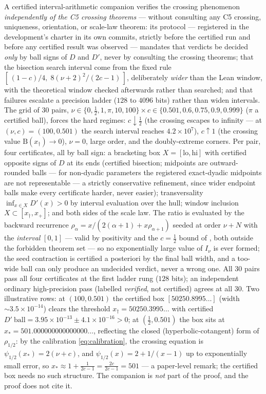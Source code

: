 \documentclass[11pt]{article}
\newcommand{\Bfam}{\mathrm{B}}
\begin{document}
A certified interval-arithmetic companion verifies the crossing
phenomenon \emph{independently of the C5 crossing theorems} ---
without consulting any C5 crossing, uniqueness, orientation, or
scale-law theorem: its protocol
--- registered in the development's charter in its own commits,
strictly before the certified run and before any certified result
was observed --- mandates that verdicts be decided \emph{only} by ball
signs of $D$ and $D'$, never by consulting the crossing theorems;
that the bisection search interval come from the fixed rule
$[\,(1-c)/4,\; 8(\nu+2)^2/(2c-1)\,]$, deliberately \emph{wider}
than the Lean window, with the theoretical window checked
afterwards rather than searched; and that failures escalate a
precision ladder ($128$ to $4096$ bits) rather than widen
intervals.  The grid of $30$ pairs,
$\nu \in \{0, \tfrac12, 1, \pi, 10, 100\} \times
c \in \{0.501, 0.6, 0.75, 0.9, 0.999\}$ ($\pi$ a certified ball),
forces the hard regimes: $c \downarrow \tfrac12$ (the crossing
escapes to infinity --- at $(\nu,c) = (100, 0.501)$ the search
interval reaches $4.2\times10^7$), $c \uparrow 1$ (the crossing
value $\Bfam(x_\dagger) \to 0$), $\nu = 0$, large order, and the
doubly-extreme corners.  Per pair, four certificates, all by ball
sign: a bracketing box $X = [\mathrm{lo}, \mathrm{hi}]$ with
certified opposite signs of $D$ at its ends (certified bisection;
midpoints are outward-rounded balls --- for non-dyadic parameters
the registered exact-dyadic midpoints are not representable --- a
strictly conservative refinement, since wider endpoint balls make
every certificate harder, never easier);
transversality $\inf_{x \in X} D'(x) > 0$ by interval evaluation
over the hull; window inclusion $X \subset [x_\dagger, x_+]$; and
both sides of the scale law.  The ratio is evaluated by the
backward recurrence
$\rho_\alpha = x/(2(\alpha+1)+x\rho_{\alpha+1})$ seeded at order
$\nu+N$ with the \emph{interval} $[0,1]$ --- valid by positivity
and the $c=\tfrac12$ bound of \cite{ErikssonC4}, both outside the
forbidden theorem set --- so no exponentially large value of
$I_\nu$ is ever formed; the seed contraction is certified a
posteriori by the final ball width, and a too-wide ball can only
produce an undecided verdict, never a wrong one.  All $30$ pairs pass all four
certificates at the first ladder rung ($128$ bits); an independent
ordinary high-precision pass (labelled \emph{verified}, not
certified) agrees at all $30$.  Two illustrative rows: at
$(100, 0.501)$ the certified box $[50250.8995\ldots]$ (width
$\sim 3.5\times10^{-14}$) clears the threshold
$x_\dagger = 50250.3995\ldots$ with certified
$D'~\mathrm{ball} = 3.95\times10^{-13} \pm 4.1\times10^{-16} > 0$;
at $(\tfrac12, 0.501)$ the box sits at
$x_* = 501.000000000000000\ldots$, reflecting the closed
(hyperbolic-cotangent) form of $\rho_{1/2}$: by the calibration
\eqref{eq:calibration}, the crossing equation is
$\psi_{1/2}(x_*) = 2(\nu+c)$, and
$\psi_{1/2}(x) = 2 + 1/(x-1)$ up to exponentially small error, so
$x_* \approx 1 + \tfrac{1}{2c-1} = \tfrac{2c}{2c-1} = 501$ --- a
paper-level remark; the certified box needs no such structure.  The companion
is \emph{not} part of the proof, and the proof does not cite it.
\end{document}
